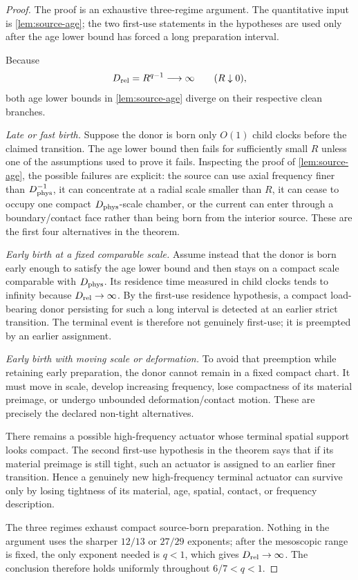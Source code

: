 \documentclass[11pt]{article}
\theoremstyle{definition}\newtheorem{definition}[theorem]{Definition}
\theoremstyle{remark}\newtheorem{remark}[theorem]{Remark}
\begin{document}
\begin{proof}
The proof is an exhaustive three-regime argument.  The quantitative input is
\cref{lem:source-age}; the two first-use statements in the hypotheses are used
only after the age lower bound has forced a long preparation interval.

Because
\[
 D_{\rm rel}=R^{q-1}\longrightarrow\infty
 \qquad(R\downarrow0),
\]
both age lower bounds in \cref{lem:source-age} diverge on their respective
clean branches.

\emph{Late or fast birth.}
Suppose the donor is born only $O(1)$ child clocks before the claimed
transition.  The age lower bound then fails for sufficiently small $R$ unless
one of the assumptions used to prove it fails.  Inspecting the proof of
\cref{lem:source-age}, the possible failures are explicit: the source can use
axial frequency finer than $D_{\rm phys}^{-1}$, it can concentrate at a radial
scale smaller than $R$, it can cease to occupy one compact
$D_{\rm phys}$-scale chamber, or the current can enter through a
boundary/contact face rather than being born from the interior source.  These
are the first four alternatives in the theorem.

\emph{Early birth at a fixed comparable scale.}
Assume instead that the donor is born early enough to satisfy the age lower
bound and then stays on a compact scale comparable with $D_{\rm phys}$.  Its
residence time measured in child clocks tends to infinity because
$D_{\rm rel}\to\infty$.  By the first-use residence hypothesis, a compact
load-bearing donor persisting for such a long interval is detected at an
earlier strict transition.  The terminal event is therefore not genuinely
first-use; it is preempted by an earlier assignment.

\emph{Early birth with moving scale or deformation.}
To avoid that preemption while retaining early preparation, the donor cannot
remain in a fixed compact chart.  It must move in scale, develop increasing
frequency, lose compactness of its material preimage, or undergo unbounded
deformation/contact motion.  These are precisely the declared non-tight
alternatives.

There remains a possible high-frequency actuator whose terminal spatial
support looks compact.  The second first-use hypothesis in the theorem says
that if its material preimage is still tight, such an actuator is assigned to
an earlier finer transition.  Hence a genuinely new high-frequency terminal
actuator can survive only by losing tightness of its material, age, spatial,
contact, or frequency description.

The three regimes exhaust compact source-born preparation.  Nothing in the
argument uses the sharper $12/13$ or $27/29$ exponents; after the mesoscopic
range is fixed, the only exponent needed is $q<1$, which gives
$D_{\rm rel}\to\infty$.  The conclusion therefore holds uniformly throughout
$6/7<q<1$.
\end{proof}
\end{document}
